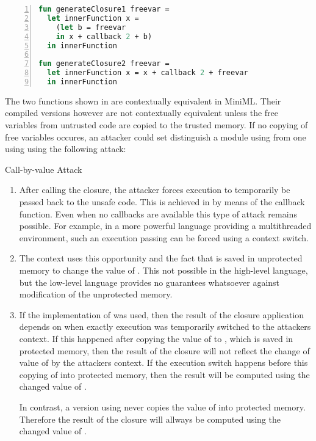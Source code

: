 \documentclass[10pt,a4paper,master=cws, masteroption=ai,english,inputenc=utf8]{kulemt}
\begin{document}
\begin{lstlisting}[frame=single, language=ML,caption=Changing free variables inside untrusted memory mid-execution can break contextual equivalence., label=code:CopyFreeVariables,numbers=left]
fun generateClosure1 freevar =
  let innerFunction x =
    (let b = freevar
    in x + callback 2 + b)
  in innerFunction

fun generateClosure2 freevar = 
  let innerFunction x = x + callback 2 + freevar
  in innerFunction
\end{lstlisting}
\label{code:CopyFreeVariables}

The two functions shown in  are contextually equivalent in \mbox{MiniML}.
Their compiled versions however are not contextually equivalent unless the free variables from untrusted code are copied to the trusted memory.
If no copying of free variables occures, an attacker could set distinguish a module using  from one using  using the following attack:


\begin{attack}{Call-by-value Attack}
\begin{enumerate}
\item After calling the closure, the attacker forces execution to temporarily be passed back to the unsafe code.
This is achieved in  by means of the callback function. 
Even when no callbacks are available this type of attack remains possible. For example, in a more powerful language providing a multithreaded environment, such an execution passing can be forced using a context switch.
\item The context uses this opportunity and the fact that  is saved in unprotected memory to change the value of . This not possible in the high-level language, but the low-level language provides no guarantees whatsoever against modification of the unprotected memory.
\item If the implementation of  was used, then the result of the closure application depends on when exactly execution was temporarily switched to the attackers context.
If this happened after copying the value of  to , which is saved in protected memory, then the result of the closure will not reflect the change of value of  by the attackers context.
If the execution switch happens before this copying of  into protected memory, then the result will be computed using the changed value of .

In contrast, a version using   never copies the value of  into protected memory. 
Therefore the result of the closure will allways be computed using the changed value of .
\end{enumerate}
\end{attack}
\end{document}
